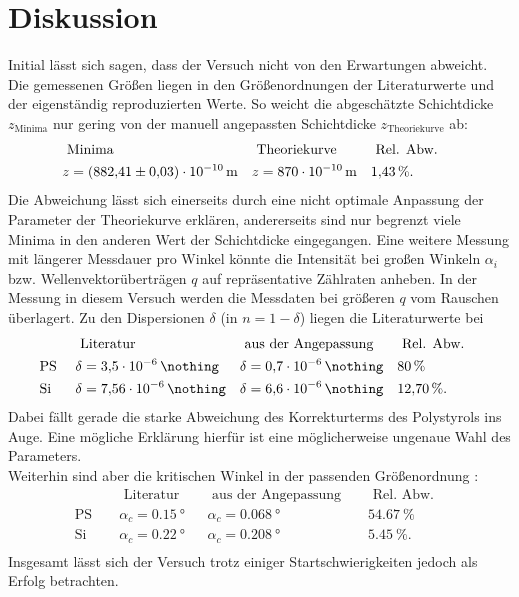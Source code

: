 \section{Diskussion}
Initial lässt sich sagen, dass der Versuch nicht von den Erwartungen abweicht.
Die gemessenen Größen liegen in den Größenordnungen der Literaturwerte und der eigenständig reproduzierten Werte.
So weicht die abgeschätzte Schichtdicke $z_{\text{Minima}}$ nur gering von der manuell angepassten Schichtdicke $z_{\text{Theoriekurve}}$ ab:
\begin{align*}
	&	\text{ Minima }					 && \text{ Theoriekurve }  	&& \text{ Rel. Abw. }	&&	\\
	&	z = \SI{882.41 \pm 0.03 e-10}{m} && z = \SI{870e-10}{m}		&& \SI{1.43}{\%}. 		&&	\\
\end{align*}
Die Abweichung lässt sich einerseits durch eine nicht optimale Anpassung der Parameter der Theoriekurve erklären, andererseits sind nur begrenzt viele Minima in den anderen Wert der Schichtdicke eingegangen.
Eine weitere Messung mit längerer Messdauer pro Winkel könnte die Intensität bei großen Winkeln $\alpha_i$ bzw. Wellenvektorüberträgen $q$ auf repräsentative Zählraten anheben.
In der Messung in diesem Versuch werden die Messdaten bei größeren $q$ vom Rauschen überlagert.
Zu den Dispersionen $\delta$ (in $n = 1 - \delta$) liegen die Literaturwerte \cite{TOL} bei
\begin{align*}
	& 				&& \text{ Literatur }				&& \text{ aus der Angepassung } 	&& \text{ Rel. Abw. }	&& \\
	& \text{ PS }	&& \delta = \SI{3.5e-6}{\nothing}	&& \delta = \SI{0.7e-6}{\nothing}	&& \SI{80}{\%} 			&& \\
	& \text{ Si }	&& \delta = \SI{7.56e-6}{\nothing}	&& \delta = \SI{6.6e-6}{\nothing}	&& \SI{12.70}{\%}.		&& \\
\end{align*}
Dabei fällt gerade die starke Abweichung des Korrekturterms des Polystyrols ins Auge.
Eine mögliche Erklärung hierfür ist eine möglicherweise ungenaue Wahl des Parameters.\\
Weiterhin sind aber die kritischen Winkel in der passenden Größenordnung \cite{TOL}:
\begin{align*}
	& 				&& \text{ Literatur }		&& \text{ aus der Angepassung } && \text{ Rel. Abw. } 	&& \\
	& \text{ PS }	&& \alpha_c = \SI{0.15}{°}	&& \alpha_c = \SI{0.068}{°}		&& \SI{54.67}{\%} 		&& \\
	& \text{ Si }	&& \alpha_c = \SI{0.22}{°}	&& \alpha_c = \SI{0.208}{°}		&& \SI{5.45}{\%}.		&& \\
\end{align*}
Insgesamt lässt sich der Versuch trotz einiger Startschwierigkeiten jedoch als Erfolg betrachten.

